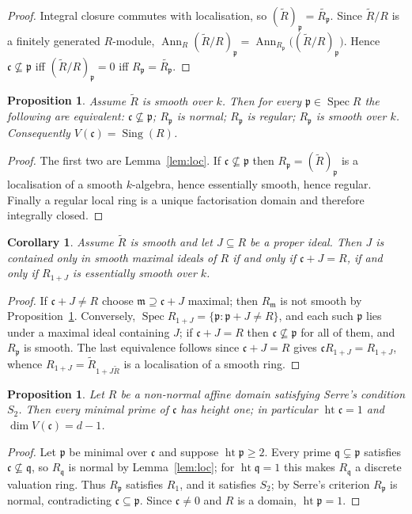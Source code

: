 \documentclass[11pt,reqno]{amsart}
\theoremstyle{plain}
\newtheorem{proposition}[theorem]{Proposition}
\newtheorem{corollary}[theorem]{Corollary}
\theoremstyle{definition}
\newcommand{\Spec}{\operatorname{Spec}}
\newcommand{\hgt}{\operatorname{ht}}
\newcommand{\Sing}{\operatorname{Sing}}
\newcommand{\Ann}{\operatorname{Ann}}
\newcommand{\Rt}{\widetilde{R}}
\newcommand{\cc}{\mathfrak{c}}
\newcommand{\mm}{\mathfrak{m}}
\newcommand{\pp}{\mathfrak{p}}
\begin{document}
\begin{proof}
Integral closure commutes with localisation, so $(\Rt)_\pp=\widetilde{R_\pp}$. Since $\Rt/R$
is a finitely generated $R$-module, $\Ann_R(\Rt/R)_\pp=\Ann_{R_\pp}\big((\Rt/R)_\pp\big)$.
Hence $\cc\not\subseteq\pp$ iff $(\Rt/R)_\pp=0$ iff $R_\pp=\widetilde{R_\pp}$.
\end{proof}
\begin{proposition}\label{prop:dictionary}
Assume $\Rt$ is smooth over $k$. Then for every $\pp\in\Spec R$ the following are equivalent:
$\cc\not\subseteq\pp$; $R_\pp$ is normal; $R_\pp$ is regular; $R_\pp$ is smooth over $k$.
Consequently $V(\cc)=\Sing(R)$.
\end{proposition}

\begin{proof}
The first two are Lemma~\ref{lem:loc}. If $\cc\not\subseteq\pp$ then $R_\pp=(\Rt)_\pp$ is a
localisation of a smooth $k$-algebra, hence essentially smooth, hence regular. Finally a
regular local ring is a unique factorisation domain and therefore integrally closed.
\end{proof}
\begin{corollary}\label{cor:BDdict}
Assume $\Rt$ is smooth and let $J\subseteq R$ be a proper ideal. Then $J$ is contained only in
smooth maximal ideals of $R$ if and only if $\cc+J=R$, if and only if $R_{1+J}$ is essentially
smooth over $k$. 
\end{corollary}

\begin{proof}
If $\cc+J\ne R$ choose $\mm\supseteq\cc+J$ maximal; then $R_\mm$ is not smooth by
Proposition~\ref{prop:dictionary}. Conversely,  $\Spec R_{1+J}=\{\pp:\pp+J\ne R\}$, and each
such $\pp$ lies under a maximal ideal containing $J$; if $\cc+J=R$ then $\cc\not\subseteq\pp$
for all of them, and $R_\pp$ is smooth. The last equivalence follows since
$\cc+J=R$ gives $\cc R_{1+J}=R_{1+J}$, whence $R_{1+J}=\Rt_{1+J\Rt}$ is a localisation of a
smooth ring.
\end{proof}


\begin{proposition}\label{prop:S2}
Let $R$ be a non-normal affine domain satisfying Serre's condition $S_2$. Then every minimal
prime of $\cc$ has height one; in particular $\hgt\cc=1$ and $\dim V(\cc)=d-1$.
\end{proposition}

\begin{proof}
Let $\pp$ be minimal over $\cc$ and suppose $\hgt\pp\ge 2$. Every prime $\mathfrak
q\subsetneq\pp$ satisfies $\cc\not\subseteq\mathfrak q$, so $R_{\mathfrak q}$ is normal by
Lemma~\ref{lem:loc}; for $\hgt\mathfrak q=1$ this makes $R_{\mathfrak q}$ a discrete valuation
ring. Thus $R_\pp$ satisfies $R_1$, and it satisfies $S_2$; by Serre's criterion $R_\pp$ is
normal, contradicting $\cc\subseteq\pp$. Since $\cc\ne 0$ and $R$ is a domain, $\hgt\pp=1$.
\end{proof}
\end{document}
